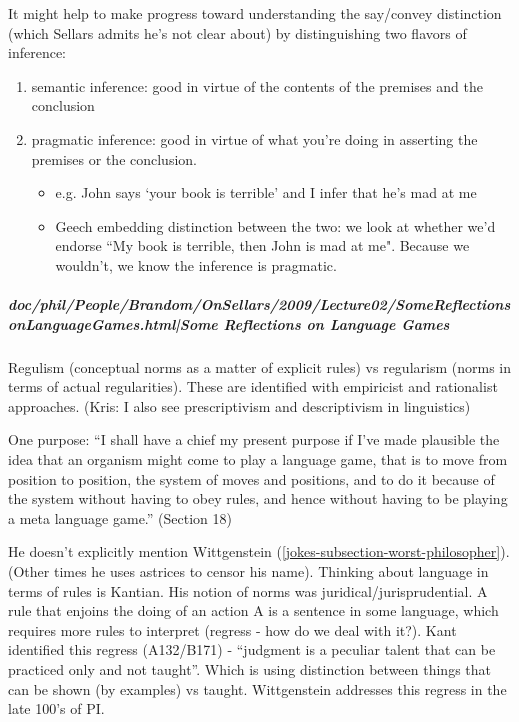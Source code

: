 \documentclass[12pt,a4paper]{report}
\begin{document}
It might help to make progress toward understanding the say/convey distinction (which Sellars admits he's not clear about) by distinguishing two flavors of inference:
\begin{enumerate}
\item semantic inference: good in virtue of the contents of the premises and the conclusion
\item pragmatic inference: good in virtue of what you're doing in asserting the premises or the conclusion.
 \begin{itemize}
 \item e.g. John says `your book is terrible' and I infer that he's mad at me
 \item Geech embedding distinction between the two: we look at whether we'd endorse ``My book is terrible, then John is mad at me". Because we wouldn't, we know the inference is pragmatic.

 \end{itemize}
\end{enumerate}
\subparagraph{doc/phil/People/Brandom/OnSellars/2009/Lecture02/SomeReflectionsonLanguageGames.html|Some Reflections on Language Games}

Regulism (conceptual norms as a matter of explicit rules) vs regularism (norms in terms of actual regularities). These are identified with empiricist and rationalist approaches. (Kris: I also see prescriptivism and descriptivism in linguistics)

One purpose: ``I shall have a chief my present purpose if I've made plausible the idea that an organism might come to play a language game, that is to move from position to position, the system of moves and positions, and to do it because of the system without having to obey rules, and hence without having to be playing a meta language game.'' (Section 18)

He doesn't explicitly mention Wittgenstein (\ref{jokes-subsection-worst-philosopher}). (Other times he uses astrices to censor his name). Thinking about language in terms of rules is Kantian. His notion of norms was juridical/jurisprudential. A rule that enjoins the doing of an action A is a sentence in some language, which requires more rules to interpret (regress - how do we deal with it?). Kant identified this regress (A132/B171) - ``judgment is a peculiar talent that can be practiced only and not taught''. Which is using distinction between things that can be shown (by examples) vs taught. Wittgenstein addresses this regress in the late 100's of PI.
\end{document}
